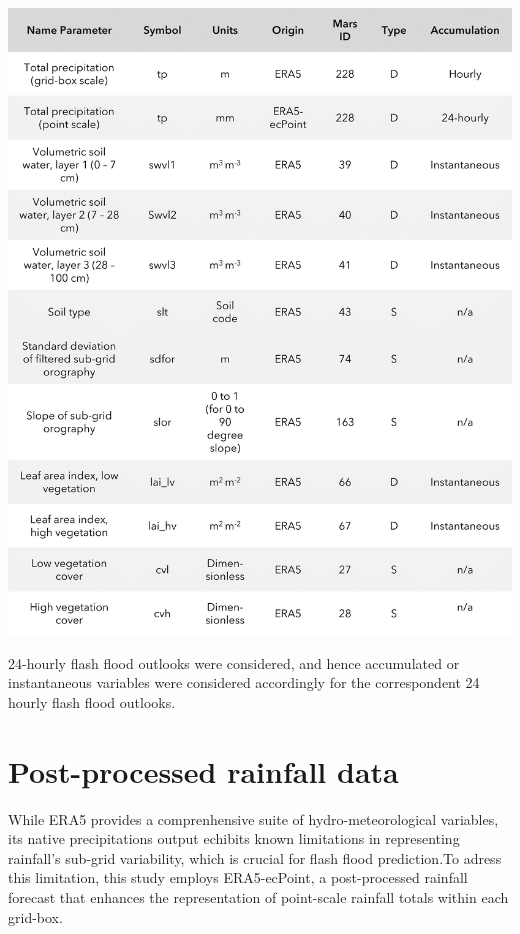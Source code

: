 \begin{table}[htbp]
\centering
{}
\includegraphics[width=1\textwidth]{parameters_used.png}
\label{table:parameters_used}
\end{table}

24-hourly flash flood outlooks were considered, and hence accumulated or instantaneous variables were considered accordingly for the correspondent 24 hourly flash flood outlooks.





\section{Post-processed rainfall data}

While ERA5 provides a comprenhensive suite of hydro-meteorological variables, its native precipitations output echibits known limitations in representing rainfall's sub-grid variability, which is crucial for flash flood prediction.To adress this limitation, this study employs ERA5-ecPoint, a post-processed rainfall forecast that enhances the representation of point-scale rainfall totals within each grid-box.  

